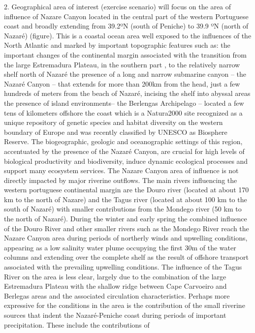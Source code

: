 2. Geographical area of interest (exercise scenario) \proj will focus on
the area of influence of Nazare Canyon located in the central part of
the western Portuguese coast and broadly extending from 39.2ºN (south of
Peniche) to 39.9 ºN (north of Nazaré) (figure). This is a coastal ocean
area well exposed to the influences of the North Atlantic and marked by
important topographic features such as: the important changes of the
continental margin associated with the transition from the large
Estremadura Plateau, in the southern part , to the relatively narrow
shelf north of Nazaré the presence of a long and narrow submarine canyon
– the Nazaré Canyon – that extends for more than 200km from the head,
just a few hundreds of meters from the beach of Nazaré, incising the
shelf into abyssal areas the presence of island environments– the
Berlengas Archipelago – located a few tens of kilometers offshore the
coast which is a Natura2000 site recognized as a unique repository of
genetic species and habitat diversity on the western boundary of Europe
and was recently classified by UNESCO as Biosphere Reserve. The
biogeographic, geologic and oceanographic settings of this region,
accentuated by the presence of the Nazaré Canyon, are crucial for high
levels of biological productivity and biodiversity, induce dynamic
ecological processes and support many ecosystem services.  The Nazare
Canyon area of influence is not directly impacted by major riverine
outflows. The main rivers influencing the western portuguese continental
margin are the Douro river (located at about 170 km to the north of
Nazare) and the Tagus river (located at about 100 km to the south of
Nazaré) with smaller contributions from the Mondego river (50 km to the
north of Nazaré). During the winter and early spring the combined
influence of the Douro River and other smaller rivers such as the
Mondego River reach the Nazare Canyon area during periods of northerly
winds and upwelling conditions, appearing as a low salinity water plume
occupying the first 30m of the water columns and extending over the
complete shelf as the result of offshore transport associated with the
prevailing upwelling conditions.  The influence of the Tagus River on
the area is less clear, largely due to the combination of the large
Estremadura Plateau with the shallow ridge between Cape Carvoeiro and
Berlegas areas and the associated circulation characteristics. Perhaps
more expressive for the conditions in the area is the contribution of
the small riverine sources that indent the Nazaré-Peniche coast during
periods of important precipitation. These include the contributions of
